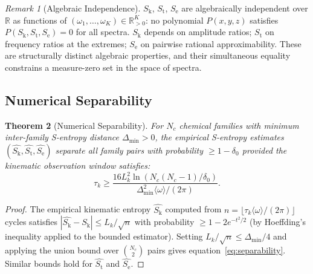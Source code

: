 \documentclass[11pt,twocolumn,a4paper]{article}
\newtheorem{theorem}{Theorem}[section]
\theoremstyle{definition}
\theoremstyle{remark}
\newtheorem{remark}[theorem]{Remark}
\newcommand{\Sk}{S_{\mathrm{k}}}
\newcommand{\St}{S_{\mathrm{t}}}
\newcommand{\Se}{S_{\mathrm{e}}}
\begin{document}
\begin{remark}[Algebraic Independence]
\label{rem:independence}
$\Sk$, $\St$, $\Se$ are algebraically independent over $\mathbb{R}$ as functions
of $(\omega_1, \ldots, \omega_K) \in \mathbb{R}^K_{>0}$: no polynomial
$P(x,y,z)$ satisfies $P(\Sk, \St, \Se) = 0$ for all spectra.
$\Sk$ depends on amplitude ratios; $\St$ on frequency ratios at the extremes;
$\Se$ on pairwise rational approximability. These are structurally distinct
algebraic properties, and their simultaneous equality constrains a measure-zero
set in the space of spectra.
\end{remark}

\subsection{Numerical Separability}

\begin{theorem}[Numerical Separability]
\label{thm:separability}
For $N_c$ chemical families with minimum inter-family S-entropy distance
$\Delta_{\min} > 0$, the empirical S-entropy estimates $(\hat{\Sk}, \hat{\St},
\hat{\Se})$ separate all family pairs with probability $\geq 1 - \delta_0$
provided the kinematic observation window satisfies:
\begin{equation}
\tau_k \geq \frac{16 L_k^2 \ln(N_c(N_c-1)/\delta_0)}{\Delta_{\min}^2 \langle\omega\rangle / (2\pi)}.
\label{eq:separability}
\end{equation}
\end{theorem}

\begin{proof}
The empirical kinematic entropy $\hat{\Sk}$ computed from $n = \lfloor
\tau_k \langle\omega\rangle / (2\pi) \rfloor$ cycles satisfies
$|\hat{\Sk} - \Sk| \leq L_k / \sqrt{n}$ with probability $\geq 1 - 2e^{-t^2/2}$
(by Hoeffding's inequality \citep{hoeffding1963} applied to the bounded estimator).
Setting $L_k/\sqrt{n} \leq \Delta_{\min}/4$ and applying the union bound over
$\binom{N_c}{2}$ pairs gives equation~\eqref{eq:separability}.
Similar bounds hold for $\hat{\St}$ and $\hat{\Se}$.
\end{proof}
\end{document}
